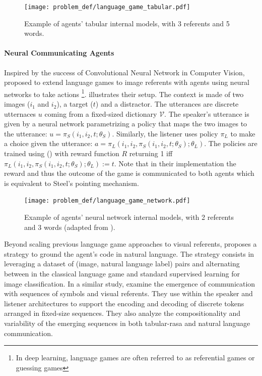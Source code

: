 \begin{figure}[!h]
\centering
\texttt{[image: problem\_def/language\_game\_tabular.pdf]}	
\caption{Example of agents' tabular internal models, with 3 referents and 5 words.}
\label{fig:language_game_tabular}
\end{figure}

\paragraph{Neural Communicating Agents}

Inspired by the success of Convolutional Neural Network in Computer Vision, \citet{lazaridou2017multiagent} proposed to extend language games to image referents with agents using neural networks to take actions \footnote{In deep learning, language games are often referred to as referential games or guessing games}.  illustrates their setup. The context is made of two images ($i_1$ and $i_2$), a target ($t$) and a distractor. The utterances are discrete utternaces $u$ coming from a fixed-sized dictionary $\mathcal{V}$.  The speaker's utterance is given by a neural network parametrizing a policy that maps the two images to the utterance: $u=\pi_S(i_1,i_2,t; \theta_S)$. Similarly, the listener uses policy $\pi_L$ to make a choice given the utterance: $a=\pi_L(i_1,i_2,\pi_S(i_1,i_2,t; \theta_S);\theta_L)$. The policies are trained using \rl () with reward function $R$ returning 1 iff $\pi_L(i_1,i_2,\pi_S(i_1,i_2,t; \theta_S);\theta_L) := t$. Note that in their implementation the reward and thus the outcome of the game is communicated to both agents which is equivalent to Steel's pointing mechanism. 

\begin{figure}[!h]
\centering
\texttt{[image: problem\_def/language\_game\_network.pdf]}	
\caption{Example of agents' neural network internal models, with 2 referents and 3 words (adapted from \citet{lazaridou2017multiagent}).}
\label{fig:language_game_network}
\end{figure}

Beyond scaling previous language game approaches to visual referents, \citet{lazaridou2017multiagent} proposes a strategy to ground the agent's code in natural language. The strategy consists in leveraging a dataset of (image, natural language label) pairs and alternating between \rl in the classical language game and standard supervised learning for image classification. In a similar study, \citet{havrylov2017emergence} examine the emergence of communication with sequences of symbols and visual referents. They use \lstms within the speaker and listener architectures to support the encoding and decoding of discrete tokens arranged in fixed-size sequences. They also analyze the compositionality and variability of the emerging sequences in both tabular-rasa and natural language communication. 

